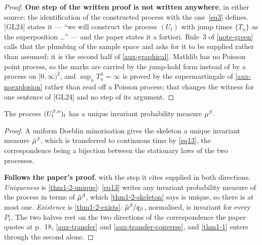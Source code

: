 \begin{proof}
  \textbf{One step of the written proof is not written anywhere}, in either
  source: the identification of the constructed process with the one~\ref{eq3}
  defines.  [GL24] states it --- ``we will construct the process $(U_t)$ with jump
  times $\{T_n\}$ as the superposition \dots'' --- and the paper states it a
  fortiori.  Rule~3 of \ref{note-green} calls that the plumbing of the sample
  space and asks for it to be supplied rather than assumed; it is the second half
  of \ref{aux-graphical}.  Mathlib has no Poisson point process, so the marks are
  carried by the jump-hold form instead of by a process on $[0,\infty)^2$, and
  $\sup_n T^\lambda_n = \infty$ is proved by the supermartingale of
  \ref{aux-noexplosion} rather than read off a Poisson process; that changes the
  witness for one sentence of [GL24] and no step of its argument.
\end{proof}

\begin{theorem}
  \label{thm1-2}
  \leanok
  The process $(U^{\beta,u}_t)_t$ has a unique invariant probability measure
  $\mu^\beta$.
\end{theorem}
\begin{proof}
  \leanok
  A uniform Doeblin minorisation gives the skeleton a unique invariant measure
  $\tilde{\mu}^\beta$, which is transferred to continuous time by \ref{eq13}, the
  correspondence being a bijection between the stationary laws of the two
  processes.

  \textbf{Follows the paper's proof}, with the step it cites supplied in both
  directions.  \emph{Uniqueness} is \ref{thm1-2-unique}: \ref{eq13} writes any
  invariant probability measure of the process in terms of $\tilde{\mu}^\beta$, which
  \ref{thm1-2-skeleton} says is unique, so there is at most one.
  \emph{Existence} is \ref{thm1-2-exists}: $\tilde{\mu}^\beta/q_\beta$, normalised, is
  invariant for every $P_t$.  The two halves rest on the two directions of the
  correspondence the paper quotes at p.~18, \ref{aux-transfer} and
  \ref{aux-transfer-converse}, and \ref{thm1-1} enters through the second alone.
\end{proof}

